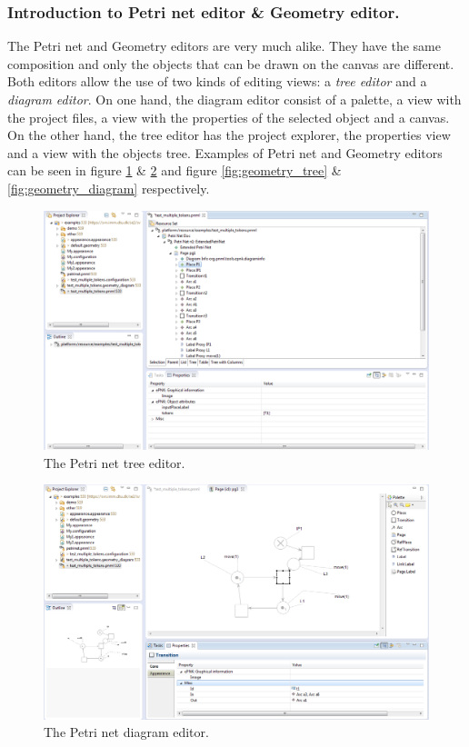 \subsubsection{Introduction to Petri net editor \& Geometry editor.}
The Petri net and Geometry editors are very much alike. They have the same composition and only the objects that can be drawn on the canvas are different. Both editors allow the use of two kinds of editing views: a \textit{tree editor} and a \textit{diagram editor}. On one hand, the diagram editor consist of a palette, a view with the project files, a view with the properties of the selected object and a canvas. On the other hand, the tree editor has the project explorer, the properties view and a view with the objects tree. Examples of Petri net and Geometry editors can be seen in figure \ref{fig:petrinet_tree} \& \ref{fig:petrinet_diagram} and figure \ref{fig:geometry_tree} \& \ref{fig:geometry_diagram} respectively. 

\begin{figure}[H]
\begin{center}
\includegraphics[scale=0.45]{image/ui/petrinet_tree.png}
\caption{The Petri net tree editor.}
\label{fig:petrinet_tree}
\end{center}
\end{figure}

\begin{figure}[H]
\begin{center}
\includegraphics[scale=0.45]{image/ui/petrinet_diagram.png}
\caption{The Petri net diagram editor.}
\label{fig:petrinet_diagram}
\end{center}
\end{figure}

